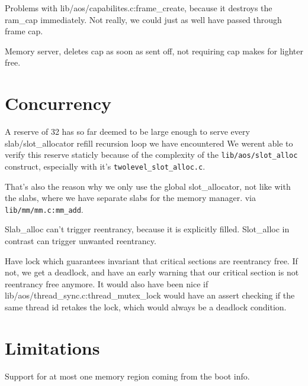 Problems with lib/aos/capabilites.c:frame\_create, because it destroys the ram\_cap
immediately. Not really, we could just as well have passed through frame cap.

Memory server, deletes cap as soon as sent off, not requiring cap makes for lighter
free.

\section{Concurrency}\label{mem-con}

A reserve of 32 has so far deemed to be large enough to serve every
slab/slot\_allocator refill recursion loop we have encountered
We werent able to verify this reserve staticly because of the complexity of the
\verb|lib/aos/slot_alloc| construct, especially with it's
\verb|twolevel_slot_alloc.c|.

That's also the reason why we only use the global slot\_allocator, not like with
the slabs, where we have separate slabs for the memory manager.
via \verb|lib/mm/mm.c:mm_add|.

Slab\_alloc can't trigger reentrancy, because it is explicitly filled. Slot\_alloc
in contrast can trigger unwanted reentrancy.

Have lock which guarantees invariant that critical sections are reentrancy free.
If not, we get a deadlock, and have an early warning that our critical section
is not reentrancy free anymore.
It would also have been nice if lib/aos/thread\_sync.c:thread\_mutex\_lock would
have an assert checking if the same thread id retakes the lock, which would
always be a deadlock condition.

\section{Limitations}

Support for at most one memory region coming from the boot info.
